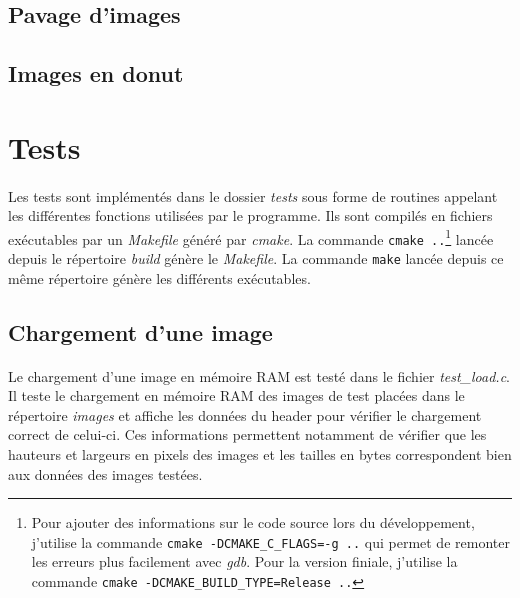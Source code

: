 \documentclass{article}
\begin{document}
    \newpage
    \subsection{Pavage d'images}
    \paragraph{}
    


    \subsection{Images en donut}




    \newpage
    \section{Tests}
    \paragraph{}
    Les tests sont implémentés dans le dossier \emph{tests} sous forme de routines appelant les différentes fonctions utilisées par le programme. Ils sont compilés en fichiers exécutables par un \emph{Makefile} généré par \emph{cmake}. La commande \texttt{cmake ..}\footnote{Pour ajouter des informations sur le code source lors du développement, j'utilise la commande \texttt{cmake -DCMAKE\_C\_FLAGS=-g ..} qui permet de remonter les erreurs plus facilement avec \emph{gdb}. Pour la version finiale, j'utilise la commande \texttt{cmake -DCMAKE\_BUILD\_TYPE=Release ..}} lancée depuis le répertoire \emph{build} génère le \emph{Makefile}. La commande \texttt{make} lancée depuis ce même répertoire génère les différents exécutables.


    \subsection{Chargement d'une image}
    \paragraph{}
    Le chargement d'une image en mémoire RAM est testé dans le fichier \emph{test\_load.c}. Il teste le chargement en mémoire RAM des images de test placées dans le répertoire \emph{images} et affiche les données du header pour vérifier le chargement correct de celui-ci. Ces informations permettent notamment de vérifier que les hauteurs et largeurs en pixels des images et les tailles en bytes correspondent bien aux données des images testées.
\end{document}
